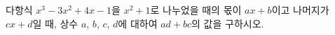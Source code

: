 다항식 $x^3-3x^2+4x-1$을 $x^2+1$로 나누었을 때의 몫이 $ax+b$이고 나머지가 $cx+d$일 때, 상수 $a$, $b$, $c$, $d$에 대하여 $ad+bc$의 값을 구하시오.
